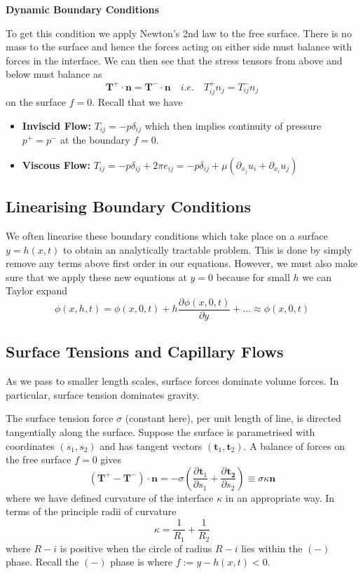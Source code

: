 \documentclass[11pt]{article}
\newcommand*{\pd}[3][]{\ensuremath{\frac{\partial^{#1} {#2}}{\partial {#3}^{#1}}}}
\newcommand{\defeq}{:=}
\newcommand{\mv}[1]{\bm{#1}}
\begin{document}
\noindent\textbf{Dynamic Boundary Conditions}

To get this condition we apply Newton's 2nd law to the free surface.
There is no mass to the surface and hence the forces acting on either side must balance with forces in the interface.
We can then see that the stress tensors from above and below must balance as
\[
	\mv{T}^+ \cdot \mv{n} = \mv{T}^- \cdot \mv{n} \quad i.e. \quad T^+_{ij}n_j = T^-_{ij}n_j
\]
on the surface $f=0$.
Recall that we have
\begin{itemize}
	\item \textbf{Inviscid Flow: } $T_{ij}=-p\delta_{ij}$ which then implies continuity of pressure $p^+=p^-$ at the boundary $f=0$.
	\item \textbf{Viscous Flow: } $T_{ij}= -p\delta_{ij} + 2\pi e_{ij}
		= -p\delta_{ij} + \mu \left( \partial_{x_j} u_i + \partial_{x_i} u_j \right)$
\end{itemize}

\subsection{Linearising Boundary Conditions}
We often linearise these boundary conditions which take place on a surface $y=h(x, t)$ to obtain an analytically tractable problem.
This is done by simply remove any terms above first order in our equations.
However, we must also make sure that we apply these new equations at $y=0$ because for small $h$ we can Taylor expand
\[
	\phi(x, h, t) = \phi(x, 0 , t) + h \pd{\phi(x, 0 , t)}{y}+ \dots \approx \phi(x, 0, t)
\]

\subsection{Surface Tensions and Capillary Flows}
As we pass to smaller length scales, surface forces dominate volume forces.
In particular, surface tension dominates gravity.

The surface tension force $\sigma$ (constant here), per unit length of line, is directed tangentially along the surface.
Suppose the surface is parametrised with coordinates $(s_1, s_2)$ and has tangent vectors $(\mv{t}_1, \mv{t}_2)$.
A balance of forces on the free surface $f=0$ gives
\[
	(\mv{T}^+ - \mv{T}^-) \cdot \mv{n} = - \sigma \left( \pd{\mv{t}_1}{s_1}+\pd{\mv{t_2}}{s_2}\right)\equiv \sigma\kappa \mv{n}
\]
where we have defined curvature of the interface $\kappa$ in an appropriate way.
In terms of the principle radii of curvature
\[
	\kappa=\frac{1}{R_1} + \frac{1}{R_2}
\]
where $R-i$ is positive when the circle of radius $R-i$ lies within the $(-)$ phase.
Recall the $(-)$ phase is where $f\defeq y - h(x, t) < 0$.
\end{document}
